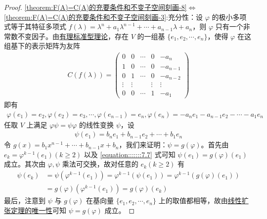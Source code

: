\documentclass[../../main.tex]{subfiles}%
\begin{document}
\begin{proof}
\noindent\ref{theorem:F(A)=C(A)的充要条件和不变子空间刻画-8}$\Leftrightarrow$ \ref{theorem:F(A)=C(A)的充要条件和不变子空间刻画-3}:{\heiti 充分性：}设 $\varphi$ 的极小多项式等于其特征多项式 $f(\lambda)=\lambda^n + a_1\lambda^{n - 1}+\cdots + a_{n - 1}\lambda + a_n$，则 $\varphi$ 只有一个非常数不变因子。由\hyperref[theorem:有理标准型核心定理]{有理标准型理论}，存在 $V$ 的一组基 $\{e_1,e_2,\cdots,e_n\}$，使得 $\varphi$ 在这组基下的表示矩阵为友阵
\begin{align*}
C(f(\lambda))=\begin{pmatrix}
0 & 0 & \cdots & 0 & -a_n \\
1 & 0 & \cdots & 0 & -a_{n - 1} \\
0 & 1 & \cdots & 0 & -a_{n - 2} \\
\vdots & \vdots & & \vdots & \vdots \\
0 & 0 & \cdots & 1 & -a_1
\end{pmatrix}
\end{align*}
即有
\begin{align*}
\varphi(e_1)=e_2,\varphi(e_2)=e_3,\cdots,\varphi(e_{n - 1})=e_n,\varphi(e_n)=-a_ne_1 - a_{n - 1}e_2 - \cdots - a_1e_n
\end{align*}
任取 $V$ 上满足 $\varphi\psi = \psi\varphi$ 的线性变换 $\psi$，设
\begin{align}
\psi(e_1)=b_ne_1 + b_{n - 1}e_2 + \cdots + b_1e_n\label{equation:::::::7.7}
\end{align}
令 $g(x)=b_1x^{n - 1}+\cdots + b_{n - 1}x + b_n$，我们来证明：$\psi = g(\varphi)$。首先由 $e_k=\varphi^{k - 1}(e_1)(k\geqslant  2)$ 以及 \eqref{equation:::::::7.7} 式可知 $\psi(e_1)=g(\varphi)(e_1)$ 成立。其次由 $\varphi,\psi$ 乘法可交换，故对任意的 $e_k(k\geqslant  2)$ 有
\begin{align*}
\psi(e_k)&=\psi(\varphi^{k - 1}(e_1))=\varphi^{k - 1}(\psi(e_1))=\varphi^{k - 1}(g(\varphi)(e_1))\\
&=g(\varphi)(\varphi^{k - 1}(e_1))=g(\varphi)(e_k)
\end{align*}
最后，注意到 $\psi$ 与 $g(\varphi)$ 在基向量 $\{e_1,e_2,\cdots,e_n\}$ 上的取值都相等，故由\hyperref[theorem:线性扩张定理]{线性扩张定理的唯一性}可知 $\psi = g(\varphi)$ 成立。


\end{proof}
\end{document}
